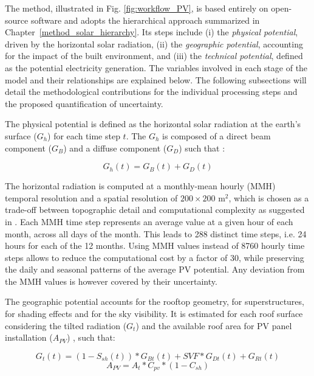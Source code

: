 The method, illustrated in Fig. \ref{fig:workflow_PV}, is based entirely on open-source software and adopts the hierarchical approach summarized in Chapter~\ref{method_solar_hierarchy}. Its steps include 
(i) the \textit{physical potential}, driven by the horizontal solar radiation, 
(ii) the \textit{geographic potential}, accounting for the impact of the built environment, and
(iii) the \textit{technical potential}, defined as the potential electricity generation.
The variables involved in each stage of the model and their relationships are explained below. The following subsections will detail the methodological contributions for the individual processing steps and the proposed quantification of uncertainty.

The physical potential is defined as the horizontal solar radiation at the earth's surface ($G_h$) for each time step $t$. The $G_h$ is composed of a direct beam component ($G_B$) and a diffuse component ($G_D$) such that \cite{loutzenhiser_empirical_2007}:

\begin{equation}
\label{eq:Gh}
G_{h}(t) = G_{B}(t) + G_{D}(t)
\end{equation}

The horizontal radiation is computed at a monthly-mean hourly (MMH) temporal resolution and a spatial resolution of $200 \times 200$ m$^2$, 
which is chosen as a trade-off between topographic detail and computational complexity as suggested in \cite{izquierdo_method_2008, assouline_large-scale_2018}. 
Each MMH time step represents an average value at a given hour of each month, across all days of the month. This leads to 288 distinct time steps, i.e. 24 hours for each of the 12 months. 
Using MMH values instead of 8760 hourly time steps allows to reduce the computational cost by a factor of 30, while preserving the daily and seasonal patterns of the average PV potential.
Any deviation from the MMH values is however covered by their uncertainty.

The geographic potential accounts for the rooftop geometry, for superstructures, for shading effects and for the sky visibility. It is estimated for each roof surface considering the tilted radiation ($G_t$) and the available roof area for PV panel installation ($A_{PV}$)  \cite{assouline_large-scale_2018}, such that:

\begin{equation}
\label{eq:irrad}
G_{t}(t) = (1-S_{sh}(t)) * G_{Bt}(t) + \mathit{SVF} * G_{Dt}(t) + G_{Rt}(t)
\end{equation}
\begin{equation}
\label{eq:area}
A_{PV} = A_{t} * C_{\mathit{pv}} * (1 - C_{sh})
\end{equation}

